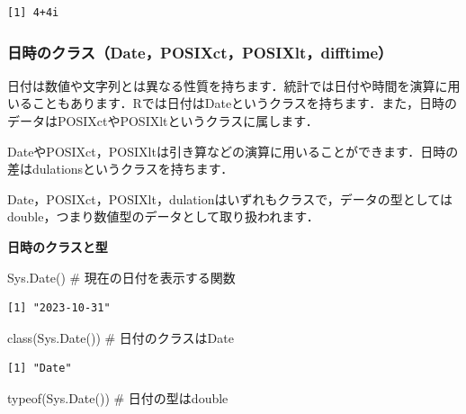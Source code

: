 \documentclass[
  letterpaper,
  DIV=11,
  numbers=noendperiod]{scrreprt}
\newenvironment{Shaded}{\begin{snugshade}}{\end{snugshade}}
\newcommand{\CommentTok}[1]{\textcolor[rgb]{0.37,0.37,0.37}{#1}}
\newcommand{\FunctionTok}[1]{\textcolor[rgb]{0.28,0.35,0.67}{#1}}
\newcommand{\NormalTok}[1]{\textcolor[rgb]{0.00,0.23,0.31}{#1}}
\begin{document}
\begin{verbatim}
[1] 4+4i
\end{verbatim}

\hypertarget{ux65e5ux6642ux306eux30afux30e9ux30b9dateposixctposixltdifftime}{%
\subsubsection{日時のクラス（Date，POSIXct，POSIXlt，difftime）}\label{ux65e5ux6642ux306eux30afux30e9ux30b9dateposixctposixltdifftime}}

日付は数値や文字列とは異なる性質を持ちます．統計では日付や時間を演算に用いることもあります．Rでは日付はDateというクラスを持ちます．また，日時のデータはPOSIXctやPOSIXltというクラスに属します．

DateやPOSIXct，POSIXltは引き算などの演算に用いることができます．日時の差はdulationsというクラスを持ちます．

Date，POSIXct，POSIXlt，dulationはいずれもクラスで，データの型としてはdouble，つまり数値型のデータとして取り扱われます．

\textbf{日時のクラスと型}

\begin{Shaded}
\begin{Highlighting}[]
\FunctionTok{Sys.Date}\NormalTok{() }\CommentTok{\# 現在の日付を表示する関数}
\end{Highlighting}
\end{Shaded}

\begin{verbatim}
[1] "2023-10-31"
\end{verbatim}

\begin{Shaded}
\begin{Highlighting}[]
\FunctionTok{class}\NormalTok{(}\FunctionTok{Sys.Date}\NormalTok{()) }\CommentTok{\# 日付のクラスはDate}
\end{Highlighting}
\end{Shaded}

\begin{verbatim}
[1] "Date"
\end{verbatim}

\begin{Shaded}
\begin{Highlighting}[]
\FunctionTok{typeof}\NormalTok{(}\FunctionTok{Sys.Date}\NormalTok{()) }\CommentTok{\# 日付の型はdouble}
\end{Highlighting}
\end{Shaded}
\end{document}
